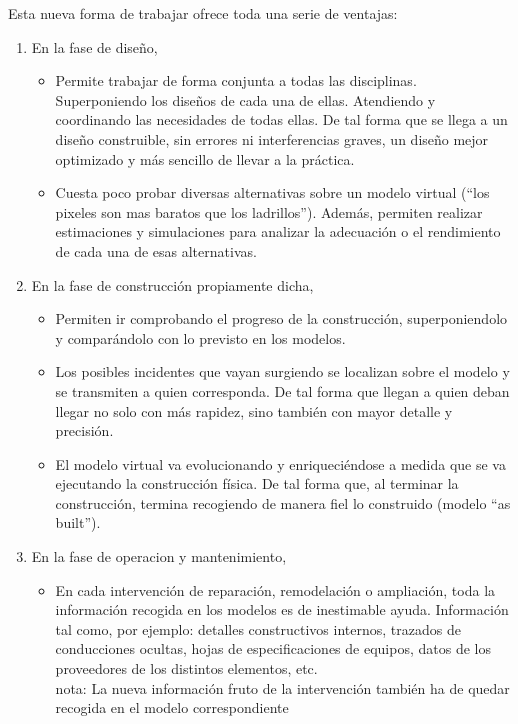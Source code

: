 \documentclass[spanish,12pt,a4paper,final,oneside]{book}
\begin{document}
Esta nueva forma de trabajar ofrece toda una serie de ventajas:
\begin{enumerate}

\item En la fase de diseño,
\begin{itemize}

\item Permite trabajar de forma conjunta a todas las disciplinas. Superponiendo los diseños de cada una de ellas. Atendiendo y coordinando las necesidades de todas ellas. De tal forma que se llega a un diseño construible, sin errores ni interferencias graves, un diseño mejor optimizado y más sencillo de llevar a la práctica.

\item Cuesta poco probar diversas alternativas sobre un modelo virtual (“los pixeles son mas baratos que los ladrillos”). Además, permiten realizar estimaciones y simulaciones para analizar la adecuación o el rendimiento de cada una de esas alternativas.

\end{itemize}

\item En la fase de construcción propiamente dicha, 
\begin{itemize}

\item Permiten ir comprobando el progreso de la construcción, superponiendolo y comparándolo con lo previsto en los modelos.

\item Los posibles incidentes que vayan surgiendo se localizan sobre el modelo y se transmiten a quien corresponda. De tal forma que llegan a quien deban llegar no solo con más rapidez, sino también con mayor detalle y precisión.  

\item El modelo virtual va evolucionando y enriqueciéndose a medida que se va ejecutando la construcción física. De tal forma que, al terminar la construcción, termina recogiendo de manera fiel lo construido (modelo ``as built'').
\end{itemize}

\item En la fase de operacion y mantenimiento,
\begin{itemize}

\item En cada intervención de reparación, remodelación o ampliación, toda la información recogida en los modelos es de inestimable ayuda. Información tal como, por ejemplo: detalles constructivos internos, trazados de conducciones ocultas, hojas de especificaciones de equipos, datos de los proveedores de los distintos elementos, etc.
\\nota: La nueva información fruto de la intervención también ha de quedar recogida en el modelo correspondiente


\end{itemize}
\end{enumerate}
\end{document}
